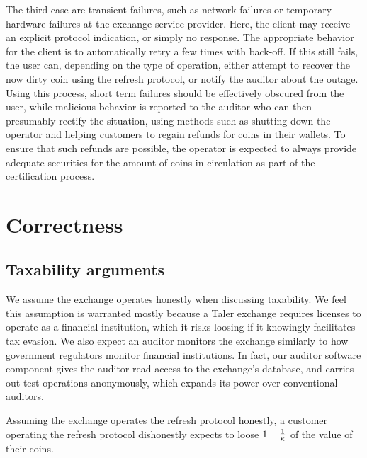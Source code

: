 \documentclass[sigconf, authordraft]{acmart}
\begin{document}
The third case are transient failures, such as network failures or
temporary hardware failures at the exchange service provider.  Here,
the client may receive an explicit protocol indication, or simply no
response.  The appropriate behavior for the client is to automatically
retry a few times with back-off.  If this still fails, the user can,
depending on the type of operation, either attempt to recover the now
dirty coin using the refresh protocol, or notify the auditor about the
outage.  Using this process, short term failures should be effectively
obscured from the user, while malicious behavior is reported to the
auditor who can then presumably rectify the situation, using methods
such as shutting down the operator and helping customers to regain
refunds for coins in their wallets.  To ensure that such refunds are
possible, the operator is expected to always provide adequate
securities for the amount of coins in circulation as part of the
certification process.



\section{Correctness}

\subsection{Taxability arguments}

We assume the exchange operates honestly when discussing taxability.
We feel this assumption is warranted mostly because a Taler exchange
requires licenses to operate as a financial institution, which it
risks loosing if it knowingly facilitates tax evasion.
We also expect an auditor monitors the exchange similarly to how
government regulators monitor financial institutions.
In fact, our auditor software component gives the auditor read access
to the exchange's database, and carries out test operations anonymously,
which expands its power over conventional auditors.

\begin{proposition}
Assuming the exchange operates the refresh protocol honestly,
a customer operating the refresh protocol dishonestly expects to
loose $1 - {1 \over \kappa}$ of the value of their coins.
\end{proposition}
\end{document}
